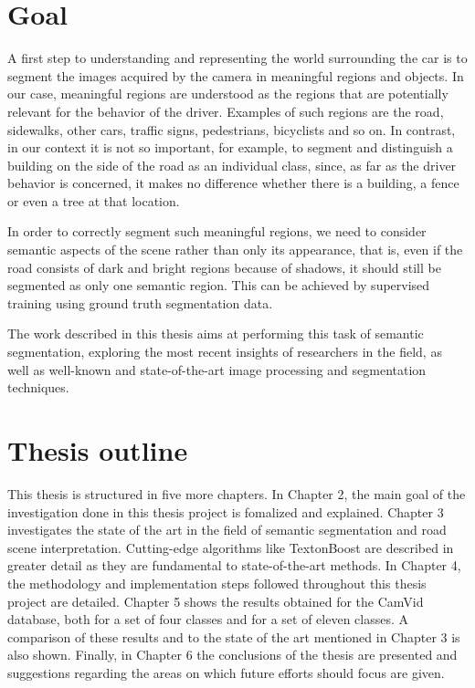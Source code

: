 \section{Goal} \label{sect:segmentation}

A first step to understanding and representing the world surrounding the car is to segment the images acquired by the camera in meaningful regions and objects. In our case, meaningful regions are understood as the regions that are potentially relevant for the behavior of the driver. Examples of such regions are the road, sidewalks, other cars, traffic signs, pedestrians, bicyclists and so on. In contrast, in our context it is not so important, for example, to segment and distinguish a building on the side of the road as an individual class, since, as far as the driver behavior is concerned, it makes no difference whether there is a building, a fence or even a tree at that location. 

In order to correctly segment such meaningful regions, we need to consider semantic aspects of the scene rather than only its appearance, that is, even if the road consists of dark and bright regions because of shadows, it should still be segmented as only one semantic region. This can be achieved by supervised training using ground truth segmentation data.

The work described in this thesis aims at performing this task of semantic segmentation, exploring the most recent insights of researchers in the field, as well as well-known and state-of-the-art image processing and segmentation techniques. 

\section{Thesis outline} \label{sect:thesis_outline}

This thesis is structured in five more chapters. In Chapter 2, the main goal of the investigation done in this thesis project is fomalized and explained.
Chapter 3 investigates the state of the art in the field of semantic segmentation and road scene interpretation. Cutting-edge algorithms like TextonBoost are described in greater detail as they are fundamental to state-of-the-art methods. In Chapter 4, the methodology and implementation steps followed throughout this thesis project are detailed.
Chapter 5 shows the results obtained for the CamVid database, both for a set of four classes and for a set of eleven classes. A comparison of these results and to the state of the art mentioned in Chapter 3 is also shown. 
Finally, in Chapter 6 the conclusions of the thesis are presented and suggestions regarding the areas on which future efforts should focus are given.